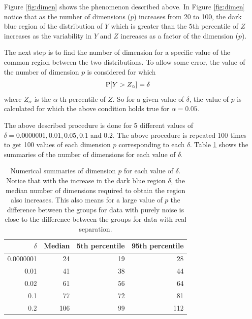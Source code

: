 \documentclass[12]{article}
\begin{document}
 Figure \ref{fig:dimen} shows the phenomenon described above. In Figure \ref{fig:dimen} notice that as the number of dimensions ($p$) increases from 20 to 100, the dark blue region of the distribution of $Y$ which is greater than the 5th percentile of $Z$ increases as the variability in $Y$ and $Z$ increases as a factor of the dimension ($p$).


The next step is to find the number of dimension for a specific value of the common region between the two distributions. To allow some error, the value of the number of dimension $p$ is considered for which $$\hbox{P}[Y > Z_{\alpha}] = \delta$$ where $Z_{\alpha}$ is the $\alpha$-th percentile of $Z$.  So for a given value of $\delta$,  the value of $p$ is calculated for which the above condition holds true for $\alpha = 0.05$.

The above described procedure is done for 5 different values of $\delta  = 0.0000001, 0.01, 0.05, 0.1$ and $0.2$. The above procedure is repeated 100 times to get 100 values of each dimension $p$ corresponding to each $\delta$. Table \ref{tab:dimen} shows the summaries of the number of dimensions for each value of $\delta$.

\begin{table}[htbp]
\begin{center}
\caption{Numerical summaries of dimension $p$ for each value of $\delta$. Notice that with the increase in the dark blue region $\delta$, the median number of dimensions required to obtain the region also increases. This also means for a large value of $p$ the difference between the groups for data with purely noise is close to the difference between the groups for data with real separation. }
\begin{tabular}{rrrr}
  \hline
  \hline
  $\delta$ & Median & 5th percentile & 95th percentile \\
  \hline
  0.0000001 & 24 & 19 & 28 \\
      0.01 & 41 & 38 & 44\\
   0.02 & 61 & 56 & 64 \\
     0.1 & 77 & 72 & 81\\   
     0.2 & 106 & 99 & 112\\ 
      \hline
\end{tabular}
\label{tab:dimen}
\end{center}
\end{table}
\end{document}
